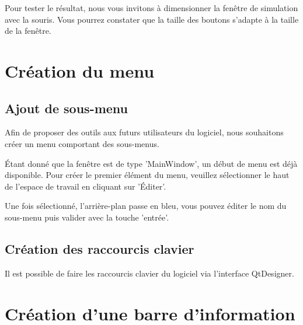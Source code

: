 \documentclass[12pt]{report}    %
\begin{document}
Pour tester le résultat, nous vous invitons à dimensionner la fenêtre de simulation avec la souris. Vous pourrez constater que la taille des boutons s'adapte à la taille de la fenêtre.





\section{Création du menu}

\subsection{Ajout de sous-menu}

Afin de proposer des outils aux futurs utilisateurs du logiciel, nous souhaitons créer un menu comportant des sous-menus.




Étant donné que la fenêtre est de type 'MainWindow', un début de menu est déjà disponible. Pour créer le premier élément du menu, veuillez sélectionner le haut de l'espace de travail en cliquant sur 'Éditer'. \newline



Une fois sélectionné, l'arrière-plan passe en bleu, vous pouvez éditer le nom du sous-menu puis valider avec la touche 'entrée'.

\subsection{Création des raccourcis clavier}

Il est possible de faire les raccourcis clavier du logiciel via l'interface QtDesigner. 


\section{Création d'une barre d'information}
\end{document}
